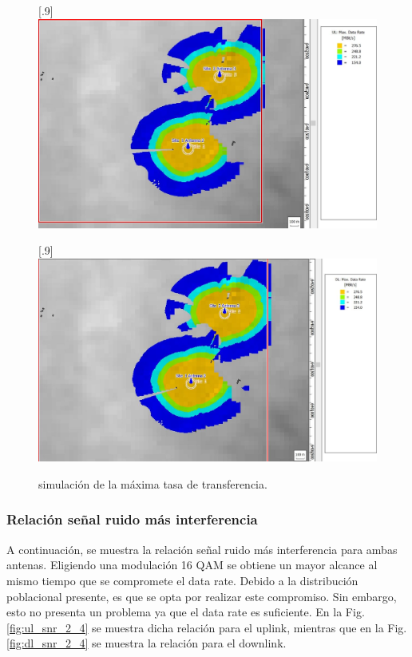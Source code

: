\documentclass[11pt,a4paper]{article}
\begin{document}
\begin{figure}[ht!]
  \centering
  [.9\linewidth]{\includegraphics[height=14\baselineskip]{fotos_ema/vel_trans_datos_1.jpg}}

  [.9\linewidth]{\includegraphics[height=14\baselineskip]{fotos_ema/vel_trans_datos_2.jpg}}
  \caption{simulación de la máxima tasa de transferencia.}
  \label{fig:vel_trans_datos_24}
\end{figure}


\subsubsection{Relación señal ruido más interferencia}

A continuación, se muestra la relación señal ruido más interferencia para ambas antenas. 
Eligiendo una modulación 16 QAM se obtiene un mayor alcance al mismo tiempo que se  compromete el data rate. 
Debido a la distribución poblacional presente, es que se opta por realizar este compromiso. 
Sin embargo, esto no presenta un problema ya que el data rate es suficiente. 
En la Fig. \ref{fig:ul_snr_2_4} se muestra dicha relación para el uplink, mientras que en la Fig. \ref{fig:dl_snr_2_4} se muestra la relación para el downlink.
\end{document}
